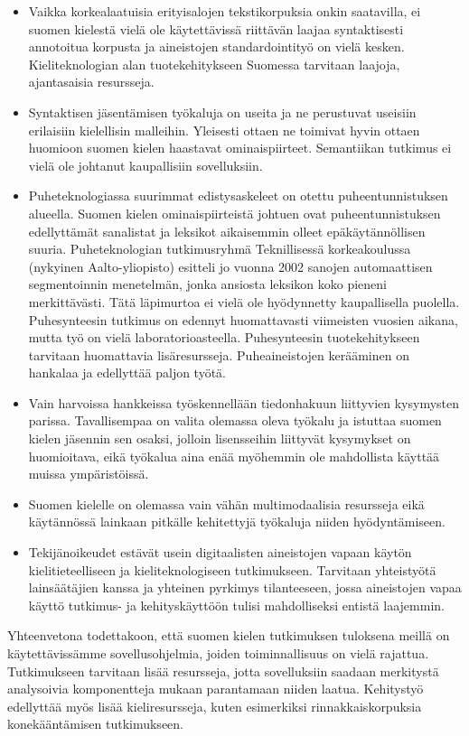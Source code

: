 \begin{multicols}{2}
\begin{itemize}
\item Vaikka korkealaatuisia erityisalojen tekstikorpuksia onkin
    saatavilla, ei suomen kielestä vielä ole käytettävissä riittävän
    laajaa syntaktisesti annotoitua korpusta ja aineistojen
    standardointityö on vielä kesken.  Kieliteknologian alan
    tuotekehitykseen Suomessa tarvitaan laajoja, ajantasaisia
    resursseja.

\item Syntaktisen jäsentämisen työkaluja on useita ja ne perustuvat
    useisiin erilaisiin kielellisin malleihin. Yleisesti ottaen ne
    toimivat hyvin ottaen huomioon suomen kielen haastavat
    ominaispiirteet. Semantiikan tutkimus ei vielä ole johtanut
    kaupallisiin sovelluksiin.

\item Puheteknologiassa suurimmat edistysaskeleet on otettu
    puheentunnistuksen alueella. Suomen kielen ominaispiirteistä
    johtuen ovat puheentunnistuksen edellyttämät sanalistat ja
    leksikot aikaisemmin olleet epäkäytännöllisen suuria.
    Puheteknologian tutkimusryhmä Teknillisessä korkeakoulussa
    (nykyinen Aalto-yliopisto) esitteli jo vuonna 2002 sanojen
    automaattisen segmentoinnin menetelmän, jonka ansiosta leksikon
    koko pieneni merkittävästi. Tätä läpimurtoa ei vielä ole
    hyödynnetty kaupallisella puolella. Puhesynteesin tutkimus on
    edennyt huomattavasti viimeisten vuosien aikana, mutta työ on
    vielä laboratorioasteella. Puhesynteesin tuotekehitykseen
    tarvitaan huomattavia lisäresursseja. Puheaineistojen kerääminen
    on hankalaa ja edellyttää paljon työtä.

\item Vain harvoissa hankkeissa työskennellään tiedonhakuun liittyvien
    kysymysten parissa. Tavallisempaa on valita olemassa oleva työkalu
    ja istuttaa suomen kielen jäsennin sen osaksi, jolloin
    lisensseihin liittyvät kysymykset on huomioitava, eikä työkalua
    aina enää myöhemmin ole mahdollista käyttää muissa ympäristöissä.

\item Suomen kielelle on olemassa vain vähän multimodaalisia
    resursseja eikä käytännössä lainkaan pitkälle kehitettyjä
    työkaluja niiden hyödyntämiseen.

\item Tekijänoikeudet estävät usein digitaalisten aineistojen vapaan
    käytön kielitieteelliseen ja kieliteknologiseen
    tutkimukseen. Tarvitaan yhteistyötä lainsäätäjien kanssa ja
    yhteinen pyrkimys tilanteeseen, jossa aineistojen vapaa käyttö
    tutkimus- ja kehityskäyttöön tulisi mahdolliseksi entistä
    laajemmin.
\end{itemize}
Yhteenvetona todettakoon, että suomen kielen tutkimuksen tuloksena
meillä on käytettävissämme sovellusohjelmia, joiden toiminnallisuus on
vielä rajattua.  Tutkimukseen tarvitaan lisää resursseja, jotta
sovelluksiin saadaan merkitystä analysoivia komponentteja mukaan
parantamaan niiden laatua. Kehitystyö edellyttää myös lisää
kieliresursseja, kuten esimerkiksi rinnakkaiskorpuksia konekääntämisen
tutkimukseen.



\end{multicols}
